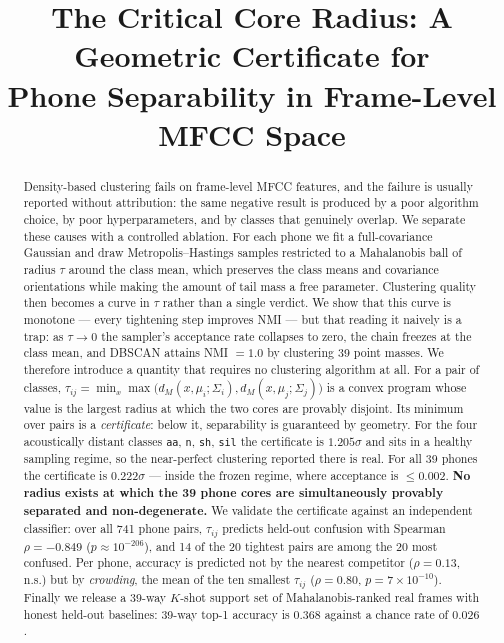 \documentclass[11pt]{article}
\title{\bf The Critical Core Radius: A Geometric Certificate for\\
Phone Separability in Frame-Level MFCC Space}
\author{}
\date{}
\newcommand{\ph}[1]{\texttt{#1}}
\begin{document}
\maketitle
\vspace{-2.5em}

\begin{abstract}
\noindent
Density-based clustering fails on frame-level MFCC features, and the failure is
usually reported without attribution: the same negative result is produced by a
poor algorithm choice, by poor hyperparameters, and by classes that genuinely
overlap. We separate these causes with a controlled ablation. For each phone we
fit a full-covariance Gaussian and draw Metropolis--Hastings samples restricted
to a Mahalanobis ball of radius $\tau$ around the class mean, which preserves
the class means and covariance orientations while making the amount of tail mass
a free parameter. Clustering quality then becomes a curve in $\tau$ rather than
a single verdict. We show that this curve is monotone --- every tightening step
improves NMI --- but that reading it naively is a trap: as $\tau \to 0$ the
sampler's acceptance rate collapses to zero, the chain freezes at the class
mean, and DBSCAN attains NMI $=1.0$ by clustering 39 point masses. We therefore
introduce a quantity that requires no clustering algorithm at all. For a pair of
classes, $\tau_{ij} = \min_x \max\big(d_M(x,\mu_i;\Sigma_i),
d_M(x,\mu_j;\Sigma_j)\big)$ is a convex program whose value is the largest
radius at which the two cores are provably disjoint. Its minimum over pairs is a
\emph{certificate}: below it, separability is guaranteed by geometry.
For the four acoustically distant classes \ph{aa}, \ph{n}, \ph{sh}, \ph{sil} the
certificate is $1.205\sigma$ and sits in a healthy sampling regime, so the
near-perfect clustering reported there is real. For all 39 phones the
certificate is $0.222\sigma$ --- inside the frozen regime, where acceptance is
$\le 0.002$. \textbf{No radius exists at which the 39 phone cores are
simultaneously provably separated and non-degenerate.} We validate the
certificate against an independent classifier: over all 741 phone pairs,
$\tau_{ij}$ predicts held-out confusion with Spearman $\rho = -0.849$
($p \approx 10^{-206}$), and 14 of the 20 tightest pairs are among the 20 most
confused. Per phone, accuracy is predicted not by the nearest competitor
($\rho = 0.13$, n.s.) but by \emph{crowding}, the mean of the ten smallest
$\tau_{ij}$ ($\rho = 0.80$, $p = 7 \times 10^{-10}$). Finally we release a 39-way
$K$-shot support set of Mahalanobis-ranked real frames with honest held-out
baselines: 39-way top-1 accuracy is $0.368$ against a chance rate of $0.026$.
\end{abstract}
\end{document}

